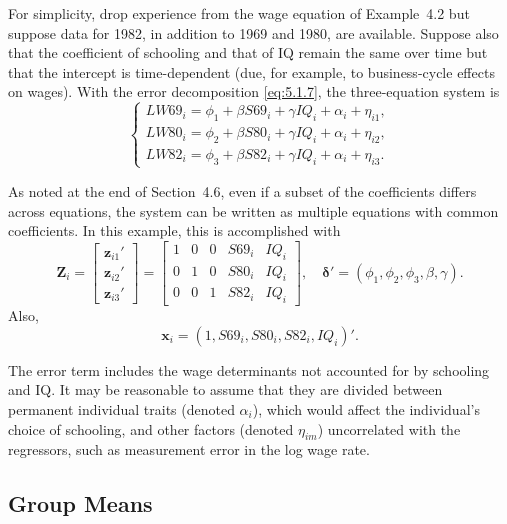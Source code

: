 \begin{example}
\label{ex:5.2}
For simplicity, drop experience from the
wage equation of Example~4.2 but suppose data for 1982, in addition to 1969
and 1980, are available. Suppose also that the coefficient of schooling and
that of IQ remain the same over time but that the intercept is time-dependent
(due, for example, to business-cycle effects on wages). With the error decomposition
\eqref{eq:5.1.7}, the three-equation system is
\[
  \begin{cases}
    LW69_i = \phi_1 + \beta S69_i + \gamma IQ_i + \alpha_i + \eta_{i1}, \\
    LW80_i = \phi_2 + \beta S80_i + \gamma IQ_i + \alpha_i + \eta_{i2}, \\
    LW82_i = \phi_3 + \beta S82_i + \gamma IQ_i + \alpha_i + \eta_{i3}.
  \end{cases}
\]

As noted at the end of Section~4.6, even if a subset of the coefficients differs
across equations, the system can be written as multiple equations with
common coefficients. In this example, this is accomplished with
\begin{equation}
  \mathbf{Z}_i = \begin{bmatrix}
    \mathbf{z}_{i1}' \\ \mathbf{z}_{i2}' \\ \mathbf{z}_{i3}'
  \end{bmatrix}
  = \begin{bmatrix}
    1 & 0 & 0 & S69_i & IQ_i \\
    0 & 1 & 0 & S80_i & IQ_i \\
    0 & 0 & 1 & S82_i & IQ_i
  \end{bmatrix}, \quad
  \boldsymbol{\delta}' = (\phi_1, \phi_2, \phi_3, \beta, \gamma).
  \label{eq:5.1.9} \tag{5.1.9}
\end{equation}
Also,
\[
  \mathbf{x}_i = (1, S69_i, S80_i, S82_i, IQ_i)'.
\]

The error term includes the wage determinants not accounted for by schooling
and IQ. It may be reasonable to assume that they are divided between
permanent individual traits (denoted $\alpha_i$), which would affect the individual's
choice of schooling, and other factors (denoted $\eta_{im}$) uncorrelated with the
regressors, such as measurement error in the log wage rate.
\end{example}

\subsection*{Group Means}

